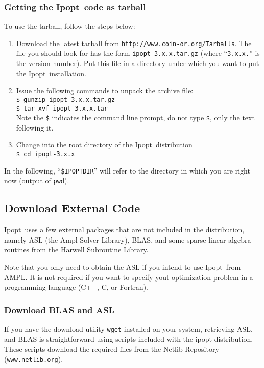 \documentclass[letter,10pt]{article}
\newcommand{\Ipopt}{{\sc Ipopt}}
\begin{document}
\subsubsection{Getting the \Ipopt\ code as tarball}

To use the tarball, follow the steps below:
\begin{enumerate}
\item Download the latest tarball from
\texttt{http://www.coin-or.org/Tarballs}.  The file you should look
for has the form \texttt{ipopt-3.x.x.tar.gz} (where
``\texttt{3.x.x.}'' is the version number).  Put this file in a
directory under which you want to put the \Ipopt\ installation.
\item Issue the following commands to unpack the archive file: \\
\texttt{\$ gunzip ipopt-3.x.x.tar.gz} \\
\texttt{\$ tar xvf ipopt-3.x.x.tar} \\
Note the {\tt \$} indicates the command line
prompt, do not type {\tt \$}, only the text following it.
\item Change into the root directory of the \Ipopt\ distribution\\
{\tt \$ cd ipopt-3.x.x}
\end{enumerate}

In the following, ``\texttt{\$IPOPTDIR}'' will refer to the directory in
which you are right now (output of \texttt{pwd}).

\subsection{Download External Code}\label{ExternalCode}
\Ipopt\ uses a few external packages that are not included in the
distribution, namely ASL (the Ampl Solver Library), BLAS, and some
sparse linear algebra routines from the Harwell Subroutine Library.

Note that you only need to obtain the ASL if you intend to use \Ipopt\
from AMPL.  It is not required if you want to specify yout
optimization problem in a programming language (C++, C, or Fortran).

\subsubsection{Download BLAS and ASL}
If you have the download utility \texttt{wget} installed on your
system, retrieving ASL, and BLAS is straightforward using scripts
included with the ipopt distribution. These scripts download the
required files from the Netlib Repository (\texttt{www.netlib.org}).\\
\end{document}
